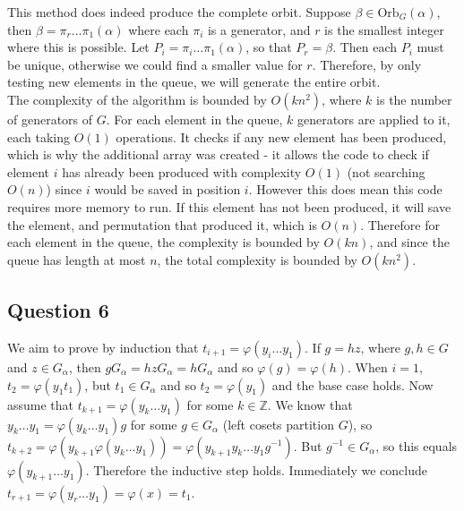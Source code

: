\documentclass[10pt,a4paper,notitlepage]{article}
\newcommand{\Z}{\mathbb{Z}}
\newcommand{\Orb}{\text{Orb}}
\begin{document}
This method does indeed produce the complete orbit. Suppose $\beta \in \Orb_{G}(\alpha)$, then $\beta = \pi_{r}\hdots \pi_{1} (\alpha)$ where each $\pi_{i}$ is a generator, and $r$ is the smallest integer where this is possible. Let $P_{i}=\pi_{i}\hdots\pi_{1}(\alpha)$, so that $P_{r}=\beta$. Then each $P_{i}$ must be unique, otherwise we could find a smaller value for $r$. Therefore, by only testing new elements in the queue, we will generate the entire orbit. \\

The complexity of the algorithm is bounded by $O(kn^{2})$, where $k$ is the number of generators of $G$. For each element in the queue, $k$ generators are applied to it, each taking $O(1)$ operations. It checks if any new element has been produced, which is why the additional array was created - it allows the code to check if element $i$ has already been produced with complexity $O(1)$ (not searching $O(n)$) since $i$ would be saved in position $i$. However this does mean this code requires more memory to run. If this element has not been produced, it will save the element, and permutation that produced it, which is $O(n)$. Therefore for each element in the queue, the complexity is bounded by $O(kn)$, and since the queue has length at most $n$, the total complexity is bounded by $O(kn^{2})$.

\subsection*{\centering Question 6}
We aim to prove by induction that $t_{i+1}=\varphi(y_{i}\hdots y_{1})$. If $g=hz$, where $g, h\in G$ and $z\in G_{\alpha}$,  then $gG_{\alpha}=hzG_{\alpha}=hG_{\alpha}$ and so $\varphi(g)=\varphi(h)$. When $i=1$, $t_{2}=\varphi(y_{1}t_{1})$, but $t_{1}\in G_{\alpha}$ and so $t_{2}=\varphi(y_{1})$ and the base case holds. Now assume that $t_{k+1}=\varphi(y_{k}\hdots y_{1})$ for some $k\in \Z$. We know that $y_{k}\hdots y_{1}=\varphi(y_{k}\hdots y_{1}) g$ for some $g\in G_{\alpha}$ (left cosets partition $G$), so $t_{k+2}=\varphi(y_{k+1}\varphi(y_{k}\hdots y_{1}))=\varphi(y_{k+1}y_{k}\hdots y_{1}g^{-1})$. But $g^{-1}\in G_{\alpha}$, so this equals $\varphi(y_{k+1}\hdots y_{1})$. Therefore the inductive step holds. Immediately we conclude $t_{r+1}=\varphi(y_{r}\hdots y_{1})=\varphi(x)=t_{1}$.\\
\end{document}
